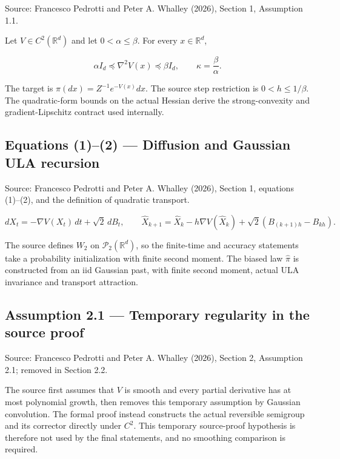 \documentclass[11pt,a4paper]{report}
\begin{document}
Source: Francesco Pedrotti and Peter A. Whalley (2026), Section 1, Assumption 1.1.



Let \(V\in C^2(\mathbb R^d)\) and let \(0<\alpha\le\beta\).
                 For every \(x\in\mathbb R^d\),


                 \[\alpha I_d\preccurlyeq\nabla^2V(x)\preccurlyeq\beta I_d,
                 \qquad\kappa=\frac\beta\alpha.\]


The target is \(\pi(dx)=Z^{-1}e^{-V(x)}dx\).
                 The source step restriction is \(0<h\le1/\beta\).
                 The quadratic-form bounds on the actual Hessian derive the
                 strong-convexity and gradient-Lipschitz contract used internally.

\subsection*{\texorpdfstring{Equations (1)–(2) — Diffusion and Gaussian ULA recursion}{Equations (1)–(2) — Diffusion and Gaussian ULA recursion}}


Source: Francesco Pedrotti and Peter A. Whalley (2026), Section 1, equations (1)–(2), and the definition of quadratic transport.

\[dX_t=-\nabla V(X_t)\,dt+\sqrt2\,dB_t,
                 \qquad\widehat X_{k+1}=\widehat X_k-h\nabla V(\widehat X_k)
                 +\sqrt2(B_{(k+1)h}-B_{kh}).\]


The source defines \(W_2\) on
                 \(\mathcal P_2(\mathbb R^d)\), so the finite-time and accuracy
                 statements take a probability initialization with finite second moment.
                 The biased law \(\widehat\pi\) is constructed from an iid Gaussian past,
                 with finite second moment, actual ULA invariance and transport attraction.

\subsection*{\texorpdfstring{Assumption 2.1 — Temporary regularity in the source proof}{Assumption 2.1 — Temporary regularity in the source proof}}


Source: Francesco Pedrotti and Peter A. Whalley (2026), Section 2, Assumption 2.1; removed in Section 2.2.



The source first assumes that \(V\) is smooth and
                 every partial derivative has at most polynomial growth, then
                 removes this temporary assumption by Gaussian convolution.
                 The formal proof instead constructs the actual reversible
                 semigroup and its corrector directly under \(C^2\).
                 This temporary source-proof hypothesis is therefore not used
                 by the final statements, and no smoothing comparison is required.
\end{document}
